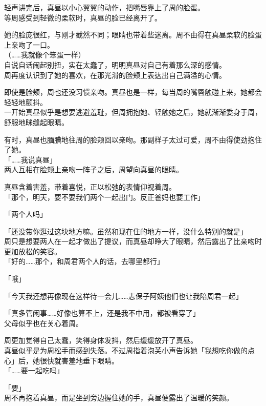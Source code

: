 轻声讲完后，真昼以小心翼翼的动作，把嘴唇靠上了周的脸蛋。\\

等周感受到轻微的柔软时，真昼的脸已经离开了。

她的脸庞很红，与刚才截然不同；眼睛也带着些迷离。周不由得在真昼柔软的脸蛋上亲吻了一口。\\

（……我就像个笨蛋一样）\\

自说自话闹起别扭，实在太蠢了，明明真昼对自己有着那么深的感情。\\

周再度认识到了她的喜欢，在那光滑的脸颊上表达出自己满溢的心情。

即使是脸颊，周也还没习惯亲吻。真昼也是一样，每当周的嘴唇触碰上来，她都会轻轻地颤抖。\\

一开始真昼似乎是想要逃避羞耻，但周拥抱她、轻触她之后，她就渐渐委身于周，舒服地眯缝起眼睛。

有时，真昼也腼腆地往周的脸颊回以亲吻。那副样子太过可爱，周不由得使劲抱住了她。\\

「……我说真昼」\\

两人互相在脸颊上亲吻一阵子之后，周望向真昼的眼睛。

真昼含着害羞，带着喜悦，正以松弛的表情仰视着周。\\

「那个，明天，要不要我们两个一起出门。反正爸妈也要工作」

「两个人吗」

「还没带你逛过这块地方嘛。虽然和现在住的地方一样，没什么特别的就是」\\

周只是想要两人在一起才做出了提议，而真昼却睁大了眼睛，然后露出了比亲吻时更加放松的笑容。\\

「好的……那个，和周君两个人的话，去哪里都行」

「哦」

「今天我还想再像现在这样待一会儿……志保子阿姨他们也让我陪周君一起」

「真多管闲事……好像也算不上，还是我不中用，都被看穿了」\\

父母似乎也在关心着周。

周更加觉得自己太蠢，笑得身体发抖，然后缓缓放开了真昼。\\

真昼似乎是为周松手而感到失落。不过周指着泡芙小声告诉她「我想吃你做的点心」后，她很快就害羞地垂下眼睛。\\

「……要一起吃吗」

「要」\\

周不再抱着真昼，而是坐到旁边握住她的手，真昼便露出了温暖的笑颜。
